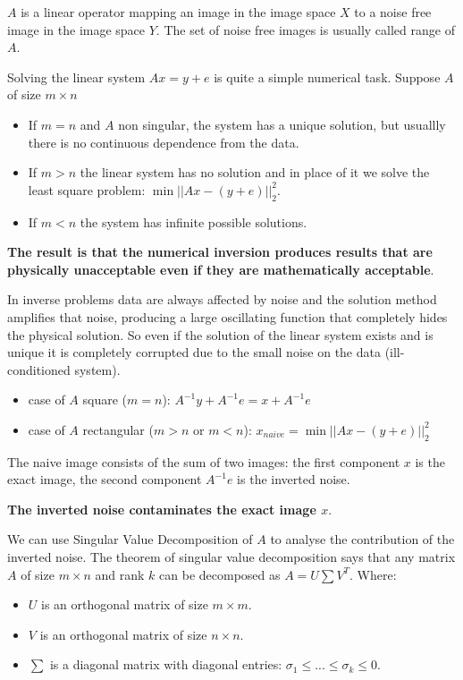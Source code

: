 \documentclass{article}
\begin{document}
$A$ is a linear operator mapping an image in the image space $X$ to a noise free image in the image space $Y$.
The set of noise free images is usually called range of $A$.

Solving the linear system $Ax = y + e$ is quite a simple numerical task.
Suppose $A$ of size $m \times n$
\begin{itemize}
  \item If $m=n$ and $A$ non singular, the system has a unique solution, but usuallly there is no continuous dependence from the data.
  \item If $m>n$ the linear system has no solution and in place of it we solve the least square problem: $\min || Ax - (y + e) ||^2_2$.
  \item If $m<n$ the system has infinite possible solutions.
\end{itemize}

\textbf{The result is that the numerical inversion produces results that are physically unacceptable even if they are mathematically acceptable}.

In inverse problems data are always affected by noise and the solution method amplifies that noise, producing a large oscillating function that completely hides the physical solution.
So even if the solution of the linear system exists and is unique it is completely corrupted due to the small noise on the data (ill-conditioned system).
\begin{itemize}
  \item case of $A$ square ($m=n$): $A^{-1} y + A^{-1} e = x + A^{-1} e$
  \item case of $A$ rectangular ($m>n$ or $m<n$): $x_{naive} = \min || Ax - (y + e) ||^2_2$
\end{itemize}

The naive image consists of the sum of two images: the first component $x$ is the exact image, the second component $A^{-1} e$ is the inverted noise.

\textbf{The inverted noise contaminates the exact image $x$}.

We can use Singular Value Decomposition of $A$ to analyse the contribution of the inverted noise.
The theorem of singular value decomposition says that any matrix $A$ of size $m\times n$ and rank $k$ can be decomposed as $A = U\sum V^T$.
Where:
\begin{itemize}
  \item $U$ is an orthogonal matrix of size $m\times m$.
  \item $V$ is an orthogonal matrix of size $n\times n$.
  \item $\sum$ is a diagonal matrix with diagonal entries: $\sigma_1 \leq ... \leq \sigma_k \leq 0$.
\end{itemize}
\end{document}
